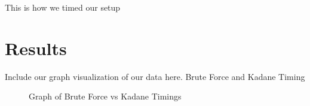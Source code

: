 \documentclass[10pt, letterpaper]{article}
\begin{document}
	This is how we timed our setup
	\section{Results}
	Include our graph visualization of our data here. Brute Force and Kadane Timing
	

	\begin{figure}[!htb]
	\caption{
		\label{fig:time-graph} Graph of Brute Force vs Kadane Timings
	}
	\end{figure}

	
\end{document}
